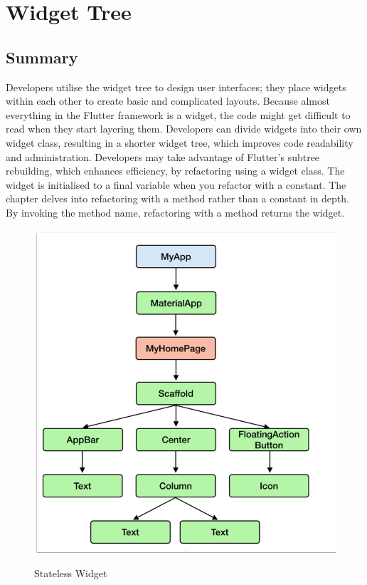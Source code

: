 \chapter{Widget Tree}

\section{Summary}
Developers utilise the widget tree to design user interfaces; they place widgets within each other to create basic and complicated layouts. Because almost everything in the Flutter framework is a widget, the code might get difficult to read when they start layering them. Developers can divide widgets into their own widget class, resulting in a shorter widget tree, which improves code readability and administration. Developers may take advantage of Flutter's subtree rebuilding, which enhances efficiency, by refactoring using a widget class. The widget is initialised to a final variable when you refactor with a constant. The chapter delves into refactoring with a method rather than a constant in depth. By invoking the method name, refactoring with a method returns the widget.\\

\begin{figure}[h]
  \begin{center}
  \includegraphics[height=120mm]{Images & Logos/CH_04_Widget_Tree.png}\\
  \end{center}
  \caption{Stateless Widget}
\end{figure}  
	